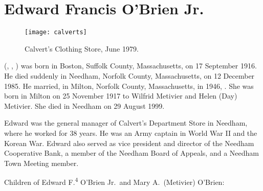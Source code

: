 \section{Edward Francis O'Brien Jr.}\label{per:Edward4OBrien3}

\begin{figure}
	\centering
	\texttt{[image: calverts]}
	\caption{Calvert's Clothing Store, June 1979.}
	\label{fig:Calverts}
\end{figure}

 (, , ) was born in Boston, Suffolk County, Massachusetts, on 17 September 1916.\cite{Edward4OBrien3Birth} He died suddenly in Needham, Norfolk County, Massachusetts, on 12 December 1985.\cite{Edward4OBrien3Death} He married, in Milton, Norfolk County, Massachusetts, in 1946, .\cite{Edward4OBrien3Marriage} She was born in Milton on 25 November 1917 to Wilfrid Metivier and Helen (Day) Metivier.\cite{MaryMetivierBirth} She died in Needham on 29 August 1999.\cite{MaryMetivierDeath}

Edward was the general manager of Calvert's Department Store in Needham, where he worked for 38 years. He was an Army captain in World War II and the Korean War. Edward also served as vice president and director of the Needham Cooperative Bank, a member of the Needham Board of Appeals, and a Needham Town Meeting member.\cite{Edward4OBrien3Obit:2}

\begin{KidsIntro}
	Children of Edward F.\textsuperscript{4} O'Brien Jr.\ and Mary A.\ (Metivier) O'Brien:
\end{KidsIntro}

\begin{Kids}
	\KidNum{}{$\bullet$}
	
	\KidNum{}{$\bullet$}
	
	\KidNum{}{$\bullet$}
	
	\KidNum{}{$\bullet$}
\end{Kids}
